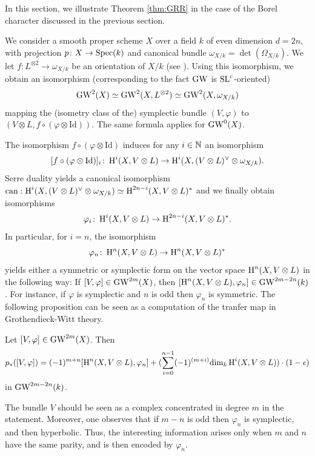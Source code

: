\begin{num}
In this section, we illustrate Theorem \ref{thm:GRR} in the case of the Borel character discussed in the previous section.

We consider a smooth proper scheme $X$ over a field $k$ of even dimension $d=2n$,
 with projection $p\colon X\to \operatorname{Spec}(k)$ and canonical bundle $\omega_{X/k}=\det(\Omega_{X/k})$.
 We let $f\colon L^{\otimes 2}\to \omega_{X/k}$ be an orientation of $X/k$
 (see ).
 Using this isomorphism, we obtain an isomorphism (corresponding to the fact $\operatorname{GW}$ is $\mathrm{SL}^c$-oriented)
\[
\operatorname{GW}^{2}(X)\simeq \operatorname{GW}^2(X,L^{\otimes 2})\simeq \operatorname{GW}^{2}(X,\omega_{X/k})
\]
mapping the (isometry class of the) symplectic bundle $(V,\varphi)$ to $(V\otimes L,f\circ(\varphi\otimes \mathrm{Id}))$. The same formula applies for $\operatorname{GW}^{0}(X)$.

The isomorphism $f\circ(\varphi\otimes \mathrm{Id})$ induces for any $i\in \mathbb{N}$ an isomorphism
\[
[f\circ(\varphi\otimes \mathrm{Id})]_i\colon\operatorname{H}^i(X,V\otimes L)\to \operatorname{H}^i(X,(V\otimes L)^\vee\otimes\omega_{X/k}).
\]
Serre duality yields a canonical isomorphism $\mathrm{can}:\operatorname{H}^i(X,(V\otimes L)^\vee\otimes\omega_{X/k})\simeq \operatorname{H}^{2n-i}(X,V\otimes L)^*$ and we finally obtain isomorphisms
\[
\varphi_i\colon \operatorname{H}^i(X,V\otimes L)\to \operatorname{H}^{2n-i}(X,V\otimes L)^*.
\]
In particular, for $i=n$, the isomorphism 
\[
\varphi_n\colon\operatorname{H}^n(X,V\otimes L)\to \operatorname{H}^{n}(X,V\otimes L)^*
\]
yields either a symmetric or symplectic form on the vector space $\operatorname{H}^n(X,V\otimes L)$ in the following way: If $[V,\varphi]\in \operatorname{GW}^{2m}(X)$, then $[\operatorname{H}^n(X,V\otimes L),\varphi_n]\in \operatorname{GW}^{2m-2n}(k)$. For instance, if $\varphi$ is symplectic and $n$ is odd then $\varphi_n$ is symmetric. The following proposition can be seen as a computation of the tranfer map in Grothendieck-Witt theory.
\end{num}
\begin{prop}
Let $[V,\varphi]\in \operatorname{GW}^{2m}(X)$. Then 
\[
p_*([V,\varphi])=(-1)^{m+n}[\operatorname{H}^n(X,V\otimes L),\varphi_n]+(\sum_{i=0}^{n-1}(-1)^{(m+i)}\mathrm{dim}_k\operatorname{H}^i(X,V\otimes L))\cdot (1-\epsilon)
\]
in $\operatorname{GW}^{2m-2n}(k)$.
\end{prop}

\begin{rem}
The bundle $V$ should be seen as a complex concentrated in degree $m$ in the statement. Moreover, one observes that if $m-n$ is odd then $\varphi_n$ is symplectic, and then hyperbolic. Thus, the interesting information arises only when $m$ and $n$ have the same parity, and is then encoded by $\varphi_n$. 
\end{rem}

